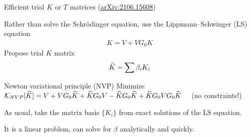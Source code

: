 \documentclass[xcolor=dvipsnames, aspectratio=169]{beamer}
\begin{document}
\begin{frame}{Efficient trial $K$ or $T$ matrices (\alert{\href{https://arxiv.org/abs/2106.15608}{arXiv:2106.15608}})}

Rather than solve the Schr{\"o}dinger equation, use the Lippmann--Schwinger (LS) equation
\begin{align*}
    K = V + V G_0 K
\end{align*}
Propose trial $K$ matrix
\begin{align}
    \widetilde{K} = \sum \beta_i K_i
\end{align}

\begin{myblock}[valign=center]{Newton variational principle (NVP)}
Minimize $\mathcal{K}_{NVP}[\widetilde{K}] = V + V G_0 \widetilde{K} + \widetilde{K} G_0 V - \widetilde{K} G_0 \widetilde{K} + \widetilde{K} G_0 V G_0 \widetilde{K}$ ~~(no constraints!)
\end{myblock}%

As usual, take the \alert{matrix basis} $\{K_i\}$ from exact solutions of the LS equation.

It is a linear problem, can solve for $\beta$ analytically and quickly.


\end{frame}
\end{document}
